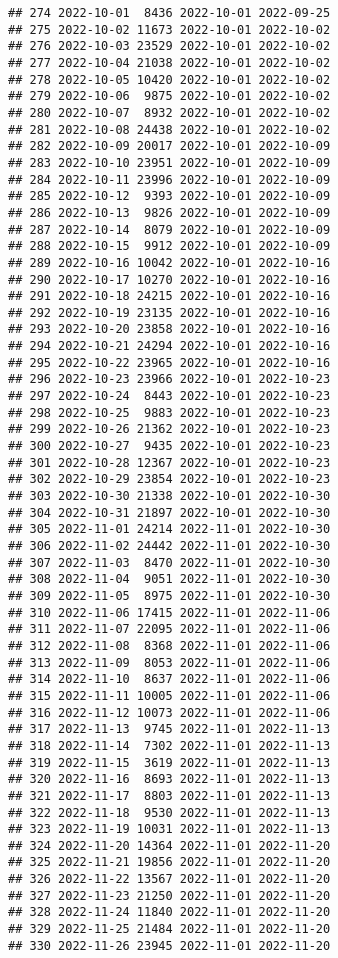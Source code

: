 \documentclass[
]{article}
\begin{document}
\begin{verbatim}
## 274 2022-10-01  8436 2022-10-01 2022-09-25
## 275 2022-10-02 11673 2022-10-01 2022-10-02
## 276 2022-10-03 23529 2022-10-01 2022-10-02
## 277 2022-10-04 21038 2022-10-01 2022-10-02
## 278 2022-10-05 10420 2022-10-01 2022-10-02
## 279 2022-10-06  9875 2022-10-01 2022-10-02
## 280 2022-10-07  8932 2022-10-01 2022-10-02
## 281 2022-10-08 24438 2022-10-01 2022-10-02
## 282 2022-10-09 20017 2022-10-01 2022-10-09
## 283 2022-10-10 23951 2022-10-01 2022-10-09
## 284 2022-10-11 23996 2022-10-01 2022-10-09
## 285 2022-10-12  9393 2022-10-01 2022-10-09
## 286 2022-10-13  9826 2022-10-01 2022-10-09
## 287 2022-10-14  8079 2022-10-01 2022-10-09
## 288 2022-10-15  9912 2022-10-01 2022-10-09
## 289 2022-10-16 10042 2022-10-01 2022-10-16
## 290 2022-10-17 10270 2022-10-01 2022-10-16
## 291 2022-10-18 24215 2022-10-01 2022-10-16
## 292 2022-10-19 23135 2022-10-01 2022-10-16
## 293 2022-10-20 23858 2022-10-01 2022-10-16
## 294 2022-10-21 24294 2022-10-01 2022-10-16
## 295 2022-10-22 23965 2022-10-01 2022-10-16
## 296 2022-10-23 23966 2022-10-01 2022-10-23
## 297 2022-10-24  8443 2022-10-01 2022-10-23
## 298 2022-10-25  9883 2022-10-01 2022-10-23
## 299 2022-10-26 21362 2022-10-01 2022-10-23
## 300 2022-10-27  9435 2022-10-01 2022-10-23
## 301 2022-10-28 12367 2022-10-01 2022-10-23
## 302 2022-10-29 23854 2022-10-01 2022-10-23
## 303 2022-10-30 21338 2022-10-01 2022-10-30
## 304 2022-10-31 21897 2022-10-01 2022-10-30
## 305 2022-11-01 24214 2022-11-01 2022-10-30
## 306 2022-11-02 24442 2022-11-01 2022-10-30
## 307 2022-11-03  8470 2022-11-01 2022-10-30
## 308 2022-11-04  9051 2022-11-01 2022-10-30
## 309 2022-11-05  8975 2022-11-01 2022-10-30
## 310 2022-11-06 17415 2022-11-01 2022-11-06
## 311 2022-11-07 22095 2022-11-01 2022-11-06
## 312 2022-11-08  8368 2022-11-01 2022-11-06
## 313 2022-11-09  8053 2022-11-01 2022-11-06
## 314 2022-11-10  8637 2022-11-01 2022-11-06
## 315 2022-11-11 10005 2022-11-01 2022-11-06
## 316 2022-11-12 10073 2022-11-01 2022-11-06
## 317 2022-11-13  9745 2022-11-01 2022-11-13
## 318 2022-11-14  7302 2022-11-01 2022-11-13
## 319 2022-11-15  3619 2022-11-01 2022-11-13
## 320 2022-11-16  8693 2022-11-01 2022-11-13
## 321 2022-11-17  8803 2022-11-01 2022-11-13
## 322 2022-11-18  9530 2022-11-01 2022-11-13
## 323 2022-11-19 10031 2022-11-01 2022-11-13
## 324 2022-11-20 14364 2022-11-01 2022-11-20
## 325 2022-11-21 19856 2022-11-01 2022-11-20
## 326 2022-11-22 13567 2022-11-01 2022-11-20
## 327 2022-11-23 21250 2022-11-01 2022-11-20
## 328 2022-11-24 11840 2022-11-01 2022-11-20
## 329 2022-11-25 21484 2022-11-01 2022-11-20
## 330 2022-11-26 23945 2022-11-01 2022-11-20

\end{verbatim}
\end{document}
